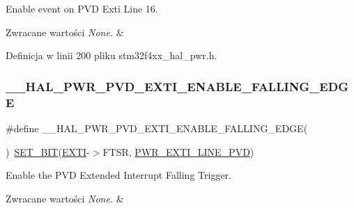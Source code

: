 Enable event on P\+VD Exti Line 16. 


\begin{DoxyRetVals}{Zwracane wartości}
{\em None.} & \\
\hline
\end{DoxyRetVals}


Definicja w linii 200 pliku stm32f4xx\+\_\+hal\+\_\+pwr.\+h.

\mbox{\label{group___p_w_r___exported___macro_ga5b971478563a00e1ee1a9d8ca8054e08}} 
\subsubsection{\texorpdfstring{\+\_\+\+\_\+\+H\+A\+L\+\_\+\+P\+W\+R\+\_\+\+P\+V\+D\+\_\+\+E\+X\+T\+I\+\_\+\+E\+N\+A\+B\+L\+E\+\_\+\+F\+A\+L\+L\+I\+N\+G\+\_\+\+E\+D\+GE}{\_\_HAL\_PWR\_PVD\_EXTI\_ENABLE\_FALLING\_EDGE}}
{\footnotesize\ttfamily \#define \+\_\+\+\_\+\+H\+A\+L\+\_\+\+P\+W\+R\+\_\+\+P\+V\+D\+\_\+\+E\+X\+T\+I\+\_\+\+E\+N\+A\+B\+L\+E\+\_\+\+F\+A\+L\+L\+I\+N\+G\+\_\+\+E\+D\+GE(\begin{DoxyParamCaption}{ }\end{DoxyParamCaption})~\hyperlink{group___exported__macro_ga26474f43799fbade9cf300e21dd3a91a}{S\+E\+T\+\_\+\+B\+IT}(\hyperlink{group___peripheral__declaration_ga9189e770cd9b63dadd36683eb9843cac}{E\+X\+TI}-\/$>$F\+T\+SR, \hyperlink{group___p_w_r___p_v_d___e_x_t_i___line_ga43a49255649e03d2d2b6b12c5c379d2b}{P\+W\+R\+\_\+\+E\+X\+T\+I\+\_\+\+L\+I\+N\+E\+\_\+\+P\+VD})}



Enable the P\+VD Extended Interrupt Falling Trigger. 


\begin{DoxyRetVals}{Zwracane wartości}
{\em None.} & \\
\hline
\end{DoxyRetVals}


